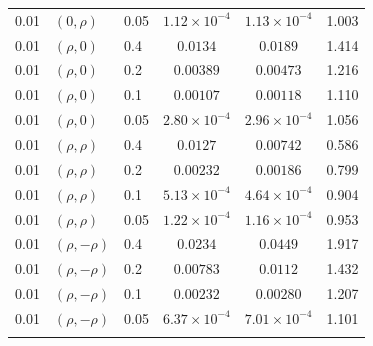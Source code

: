 \begin{table}[t]
\begin{tabular*}{\textwidth}{@{\extracolsep\fill}lllccc@{}}
0.01 & $(0,\rho)$ & 0.05 & $1.12\times10^{-4}$ & $1.13\times10^{-4}$ & 1.003\\
0.01 & $(\rho,0)$ & 0.4 & $0.0134$ & $0.0189$ & 1.414\\
0.01 & $(\rho,0)$ & 0.2 & $0.00389$ & $0.00473$ & 1.216\\
0.01 & $(\rho,0)$ & 0.1 & $0.00107$ & $0.00118$ & 1.110\\
0.01 & $(\rho,0)$ & 0.05 & $2.80\times10^{-4}$ & $2.96\times10^{-4}$ & 1.056\\
0.01 & $(\rho,\rho)$ & 0.4 & $0.0127$ & $0.00742$ & 0.586\\
0.01 & $(\rho,\rho)$ & 0.2 & $0.00232$ & $0.00186$ & 0.799\\
0.01 & $(\rho,\rho)$ & 0.1 & $5.13\times10^{-4}$ & $4.64\times10^{-4}$ & 0.904\\
0.01 & $(\rho,\rho)$ & 0.05 & $1.22\times10^{-4}$ & $1.16\times10^{-4}$ & 0.953\\
0.01 & $(\rho,-\rho)$ & 0.4 & $0.0234$ & $0.0449$ & 1.917\\
0.01 & $(\rho,-\rho)$ & 0.2 & $0.00783$ & $0.0112$ & 1.432\\
0.01 & $(\rho,-\rho)$ & 0.1 & $0.00232$ & $0.00280$ & 1.207\\
0.01 & $(\rho,-\rho)$ & 0.05 & $6.37\times10^{-4}$ & $7.01\times10^{-4}$ & 1.101\\
\botrule
\end{tabular*}
\end{table}

